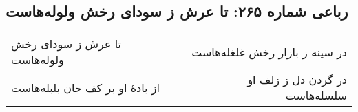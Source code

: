 \begin{center}
\section*{رباعی شماره ۲۶۵: تا عرش ز سودای رخش ولوله‌هاست}
\label{sec:0265}
\begin{longtable}{l p{0.5cm} r}
تا عرش ز سودای رخش ولوله‌هاست
&&
در سینه ز بازار رخش غلغله‌هاست
\\
از بادهٔ او بر کف جان بلبله‌هاست
&&
در گردن دل ز زلف او سلسله‌هاست
\\
\end{longtable}
\end{center}
